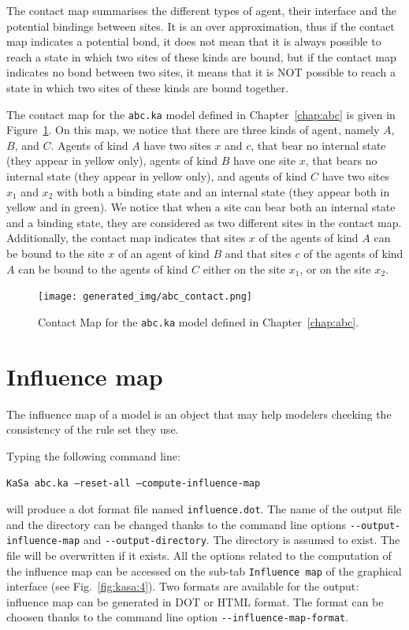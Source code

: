 \documentclass[11pt]{book}
\def\ttt#1{\texttt{#1}}
\begin{document}
The contact map summarises the different types of agent, their interface and the potential bindings between sites. It is an over approximation, thus if the contact map indicates a potential bond, it does not mean that it is always possible to reach a state in which two sites of these kinds are bound, but if the contact map indicates no bond between two sites, it means that it is NOT possible to reach a state in which two sites of these kinds are bound together.


The contact map for the \ttt{abc.ka} model  defined in Chapter~\ref{chap:abc} is given in Figure~\ref{fig:abc-contact}. On this map, we notice that there are three kinds of agent, namely $A$, $B$, and $C$.
Agents of kind $A$ have two sites $x$ and $c$, that bear no internal state (they appear in yellow only), agents of kind $B$ have one site $x$, that bears no internal state (they appear in yellow only), and agents of kind $C$ have two sites $x_1$ and $x_2$ with both a binding state and an internal state (they appear both in yellow and in green). We notice that when a site can bear both an internal state and a binding state, they are considered as two different sites in the contact map. Additionally, the contact map indicates that sites $x$ of the agents of kind $A$ can be bound to the site $x$ of an agent of kind $B$ and that sites $c$ of the agents of kind $A$ can be bound to the agents of kind $C$ either on the site $x_1$, or on the site $x_2$.

\begin{figure}[htbp]
\centering
\texttt{[image: generated\_img/abc\_contact.png]}
\caption{Contact Map for the \ttt{abc.ka} model defined in Chapter~\ref{chap:abc}.}
\label{fig:abc-contact}
\end{figure}



\section{Influence map}

The influence map of a model is an object that may help modelers checking the consistency of the rule set they use.

Typing the following command line:

\texttt{KaSa abc.ka --reset-all --compute-influence-map}

will produce a dot format file named \texttt{influence.dot}.
The name of the output file and the directory can be changed thanks to the command line options \texttt{-{}-output-influence-map} and \texttt{-{}-output-directory}.
The directory is assumed to exist. The file will be overwritten if it exists.  All the options related to the computation of the influence map can be accessed on the sub-tab \texttt{Influence map} of the graphical interface (see Fig.~\ref{fig:kasa:4}). Two formats are available for the output: influence map can be generated in DOT or HTML format. The format can be choosen thanks to the command line option \texttt{-{}-influence-map-format}.
\end{document}
